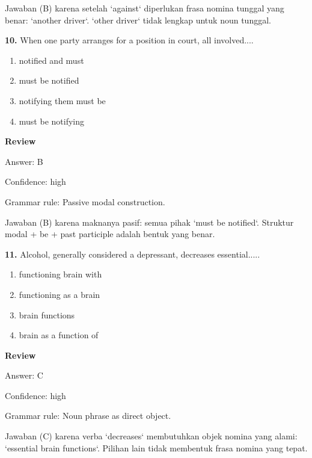 \documentclass[12pt]{article}
\begin{document}
Jawaban (B) karena setelah `against` diperlukan frasa nomina tunggal yang benar: `another driver`. `other driver` tidak lengkap untuk noun tunggal.\par
\endgroup
\par
\vspace{0.25\baselineskip}
\noindent\textbf{10.} When one party arranges for a position in court, all involved....
\begin{enumerate}[label=(\Alph*),leftmargin=*,itemsep=0.2em]
\item notified and must
\item must be notified
\item notifying them must be
\item must be notifying
\end{enumerate}
\par
\begingroup
\setlength{\parskip}{0pt}
\setlength{\parindent}{0pt}
\textbf{Review}\par
Answer: B\par
Confidence: high\par
Grammar rule: Passive modal construction.\par
Jawaban (B) karena maknanya pasif: semua pihak `must be notified`. Struktur modal + be + past participle adalah bentuk yang benar.\par
\endgroup
\par
\vspace{0.25\baselineskip}
\noindent\textbf{11.} Alcohol, generally considered a depressant, decreases essential.....
\begin{enumerate}[label=(\Alph*),leftmargin=*,itemsep=0.2em]
\item functioning brain with
\item functioning as a brain
\item brain functions
\item brain as a function of
\end{enumerate}
\par
\begingroup
\setlength{\parskip}{0pt}
\setlength{\parindent}{0pt}
\textbf{Review}\par
Answer: C\par
Confidence: high\par
Grammar rule: Noun phrase as direct object.\par
Jawaban (C) karena verba `decreases` membutuhkan objek nomina yang alami: `essential brain functions`. Pilihan lain tidak membentuk frasa nomina yang tepat.\par
\endgroup
\par
\end{document}
